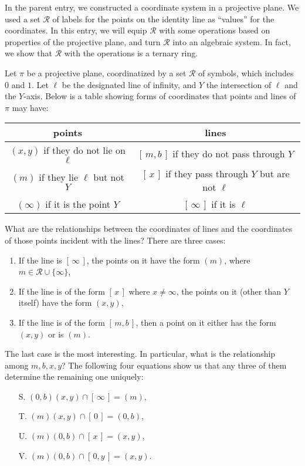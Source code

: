 \documentclass[12pt]{article}
\begin{document}
In the parent entry, we constructed a coordinate system in a projective plane.  We used a set $\mathcal{R}$ of labels for the points on the identity line as ``values'' for the coordinates.  In this entry, we will equip $\mathcal{R}$ with some operations based on properties of the projective plane, and turn $\mathcal{R}$ into an algebraic system.  In fact, we show that $\mathcal{R}$ with the operations is a ternary ring.

Let $\pi$ be a projective plane, coordinatized by a set $\mathcal{R}$ of symbols, which includes $0$ and $1$.  Let $\ell$ be the designated line of infinity, and $Y$ the intersection of $\ell$ and the $Y$-axis.  Below is a table showing forms of coordinates that points and lines of $\pi$ may have:
\begin{center}
\begin{tabular}{|c|c|}
\hline
points & lines \\
\hline\hline
$(x,y)$ if they do not lie on $\ell$ & $[\,m,b\,]$ if they do not pass through $Y$ \\
\hline
$(m)$ if they lie $\ell$ but not $Y$ & $[\,x\,]$ if they pass through $Y$ but are not $\ell$ \\
\hline
$(\infty)$ if it is the point $Y$ & $[\,\infty\,]$ if it is $\ell$ \\
\hline
\end{tabular}
\end{center}
What are the relationships between the coordinates of lines and the coordinates of those points incident with the lines?  There are three cases:
\begin{enumerate}
\item If the line is $[\,\infty\,]$, the points on it have the form $(m)$, where $m\in \mathcal{R}\cup \lbrace \infty\rbrace$,  
\item If the line is of the form $[\,x\,]$ where $x\ne \infty$, the points on it (other than $Y$ itself) have the form $(x,y)$,
\item If the line is of the form $[\,m,b\,]$, then a point on it either has the form $(x,y)$ or is $(m)$.
\end{enumerate}
The last case is the most interesting.  In particular, what is the relationship among $m,b,x,y$?  The following four equations show us that any three of them determine the remaining one uniquely:
\begin{multicols}{2}{
\begin{enumerate}
\item[S.] $(0,b)(x,y)\cap [\,\infty\,]=(m)$,
\item[T.] $(m)(x,y)\cap [\,0\,]=(0,b)$,
\item[U.] $(m)(0,b)\cap [\,x\,]=(x,y)$,
\item[V.] $(m)(0,b) \cap [\,0,y\,]=(x,y)$.
\end{enumerate}
}\end{multicols}
\end{document}
